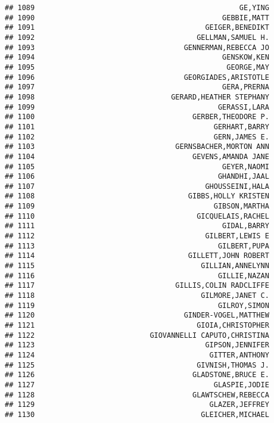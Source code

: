 \documentclass[
]{article}
\begin{document}
\begin{verbatim}
## 1089                                                GE,YING
## 1090                                            GEBBIE,MATT
## 1091                                        GEIGER,BENEDIKT
## 1092                                      GELLMAN,SAMUEL H.
## 1093                                   GENNERMAN,REBECCA JO
## 1094                                            GENSKOW,KEN
## 1095                                             GEORGE,MAY
## 1096                                   GEORGIADES,ARISTOTLE
## 1097                                            GERA,PRERNA
## 1098                                GERARD,HEATHER STEPHANY
## 1099                                           GERASSI,LARA
## 1100                                     GERBER,THEODORE P.
## 1101                                          GERHART,BARRY
## 1102                                          GERN,JAMES E.
## 1103                                 GERNSBACHER,MORTON ANN
## 1104                                     GEVENS,AMANDA JANE
## 1105                                            GEYER,NAOMI
## 1106                                           GHANDHI,JAAL
## 1107                                        GHOUSSEINI,HALA
## 1108                                    GIBBS,HOLLY KRISTEN
## 1109                                          GIBSON,MARTHA
## 1110                                      GICQUELAIS,RACHEL
## 1111                                            GIDAL,BARRY
## 1112                                        GILBERT,LEWIS E
## 1113                                           GILBERT,PUPA
## 1114                                    GILLETT,JOHN ROBERT
## 1115                                       GILLIAN,ANNELYNN
## 1116                                           GILLIE,NAZAN
## 1117                                 GILLIS,COLIN RADCLIFFE
## 1118                                       GILMORE,JANET C.
## 1119                                           GILROY,SIMON
## 1120                                   GINDER-VOGEL,MATTHEW
## 1121                                      GIOIA,CHRISTOPHER
## 1122                           GIOVANNELLI CAPUTO,CHRISTINA
## 1123                                        GIPSON,JENNIFER
## 1124                                         GITTER,ANTHONY
## 1125                                      GIVNISH,THOMAS J.
## 1126                                     GLADSTONE,BRUCE E.
## 1127                                          GLASPIE,JODIE
## 1128                                     GLAWTSCHEW,REBECCA
## 1129                                         GLAZER,JEFFREY
## 1130                                       GLEICHER,MICHAEL

\end{verbatim}
\end{document}
